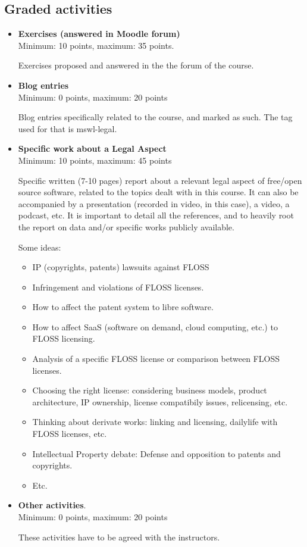 \documentclass[a4paper]{article}
\begin{document}
\subsection{Graded activities}

\begin{itemize}
\item \textbf{Exercises (answered in Moodle forum)} \\
  Minimum: 10 points, maximum: 35 points.

  Exercises proposed and answered in the the forum of the course.

\item \textbf{Blog entries} \\
  Minimum: 0 points, maximum: 20 points

  Blog entries specifically related to the course, and marked as such. The tag used for that is mswl-legal.

\item \textbf{Specific work about a Legal Aspect} \\
  Minimum: 10 points, maximum: 45 points

  Specific written (7-10 pages) report about a relevant legal aspect of free/open source software, related to the topics dealt with in this course. It can also be accompanied by a presentation (recorded in video, in this case), a video, a podcast, etc. It is important to detail all the references, and to heavily root the report on data and/or specific works publicly available.

\medskip

Some ideas:

\begin{itemize}
\item IP (copyrights, patents) lawsuits against FLOSS
\item Infringement and violations of FLOSS licenses.
\item How to affect the patent system to libre software.
\item How to affect SaaS (software on demand, cloud computing, etc.) to FLOSS licensing.
\item Analysis of a specific FLOSS license or comparison between FLOSS licenses.
\item Choosing the right license: considering business models, product architecture,  IP ownership, license compatibily issues, relicensing, etc.
\item Thinking about derivate works: linking and licensing, dailylife with FLOSS licenses, etc.
\item Intellectual Property debate: Defense and opposition to pat­ents and copyrights. 
\item Etc.

\end{itemize}



\item \textbf{Other activities}. \\
  Minimum: 0 points, maximum: 20 points

  These activities have to be agreed with the instructors.
\end{itemize}
\end{document}
